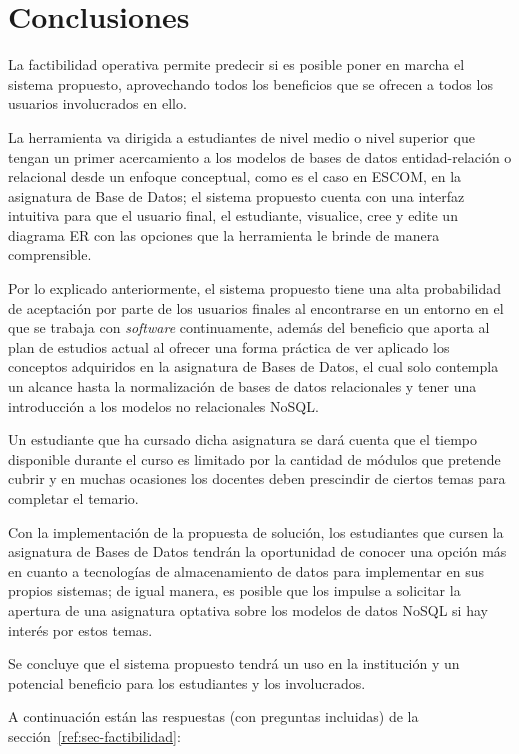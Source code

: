\newpage\section{Conclusiones}

La factibilidad operativa permite predecir si es posible poner en marcha el sistema propuesto, aprovechando todos los beneficios que se ofrecen a todos los usuarios involucrados en ello.


La herramienta va dirigida a estudiantes de nivel medio o nivel superior que tengan un primer acercamiento a los modelos de bases de datos entidad-relación o relacional desde un enfoque conceptual, como es el caso en ESCOM, en la asignatura de Base de Datos; el sistema propuesto cuenta con una interfaz intuitiva para que el usuario final, el estudiante, visualice, cree y edite un diagrama ER con las opciones que la herramienta le brinde de manera comprensible.


Por lo explicado anteriormente, el sistema propuesto tiene una alta probabilidad de aceptación por parte de los usuarios finales al encontrarse en un entorno en el que se trabaja con \textit{software} continuamente, además del beneficio que aporta al plan de estudios actual al ofrecer una forma práctica de ver aplicado los conceptos adquiridos en la asignatura de Bases de Datos, el cual solo contempla un alcance hasta la normalización de bases de datos relacionales y tener una introducción a los modelos no relacionales NoSQL.


Un estudiante que ha cursado dicha asignatura se dará cuenta que el tiempo disponible durante el curso es limitado por la cantidad de módulos que pretende cubrir y en muchas ocasiones los docentes deben prescindir de ciertos temas para completar el temario.


Con la implementación de la propuesta de solución, los estudiantes que cursen la asignatura de Bases de Datos tendrán la oportunidad de conocer una opción más en cuanto a tecnologías de almacenamiento de datos para implementar en sus propios sistemas; de igual manera, es posible que los impulse a solicitar la apertura de una asignatura optativa sobre los modelos de datos NoSQL si hay interés por estos temas.


Se concluye que el sistema propuesto tendrá un uso en la institución y un potencial beneficio para los estudiantes y los involucrados.


A continuación están las respuestas (con preguntas incluidas) de la sección~\ref{ref:sec-factibilidad}:


